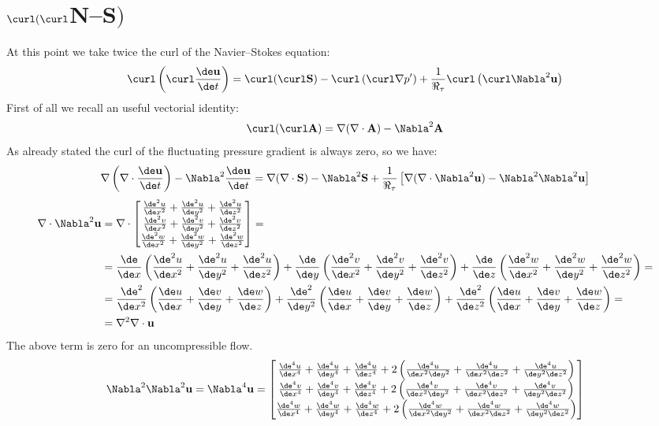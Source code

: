 \section{$\curl(\curl$N--S$)$}
At this point we take twice the curl of the Navier--Stokes equation:
\[
\curl\left(\curl\frac{\de \mathbf u}{\de t}\right)=\curl(\curl\mathbf S)-\curl\left(\curl\nabla p'\right)+\frac{1}{\Re_\tau}\curl\left(\curl\Nabla^2 \mathbf u\right)
\]
First of all we recall an useful vectorial identity:
\[
\curl(\curl \mathbf A)=\nabla(\nabla\cdot\mathbf A)-\Nabla^2\mathbf A
\]
As already stated the curl of the fluctuating pressure gradient is always zero, so we have:
\[
\nabla\left(\nabla\cdot\frac{\de \mathbf u}{\de t}\right)-\Nabla^2\frac{\de \mathbf u}{\de t}=\nabla(\nabla\cdot\mathbf S)-\Nabla^2\mathbf S+\frac{1}{\Re_\tau}\left[\nabla(\nabla\cdot\Nabla^2 \mathbf u)-\Nabla^2\Nabla^2 \mathbf u\right]
\]
\renewcommand\arraystretch{1.5}
\[
\begin{split}
\nabla\cdot\Nabla^2 \mathbf u&=\nabla \cdot
\begin{bmatrix}
\frac{\de^2 u}{\de x^2}+\frac{\de^2 u}{\de y^2}+\frac{\de^2 u}{\de z^2}\\
\frac{\de^2 v}{\de x^2}+\frac{\de^2 v}{\de y^2}+\frac{\de^2 v}{\de z^2}\\
\frac{\de^2 w}{\de x^2}+\frac{\de^2 w}{\de y^2}+\frac{\de^2 w}{\de z^2}\\
\end{bmatrix} =\\
&=\frac{\de}{\de x}\left( \frac{\de^2 u}{\de x^2}+\frac{\de^2 u}{\de y^2}+\frac{\de^2 u}{\de z^2} \right) +
\frac{\de}{\de y} \left( \frac{\de^2 v}{\de x^2}+\frac{\de^2 v}{\de y^2}+\frac{\de^2 v}{\de z^2} \right)+
\frac{\de}{\de z} \left( \frac{\de^2 w}{\de x^2}+\frac{\de^2 w}{\de y^2}+\frac{\de^2 w}{\de z^2} \right)=\\
&=\frac{\de^2}{\de x^2}\left( \frac{\de u}{\de x}+\frac{\de v}{\de y}+\frac{\de w}{\de z} \right)+
\frac{\de^2}{\de y^2}\left( \frac{\de u}{\de x}+\frac{\de v}{\de y}+\frac{\de w}{\de z} \right)+
\frac{\de^2}{\de z^2}\left( \frac{\de u}{\de x}+\frac{\de v}{\de y}+\frac{\de w}{\de z} \right)=\\
&=\nabla^2 \nabla\cdot\mathbf u
\end{split}
\]
\renewcommand\arraystretch{1}
The above term is zero for an uncompressible flow.\\
\renewcommand\arraystretch{1.5}
\[
\Nabla^2\Nabla^2\mathbf u=\Nabla^4 \mathbf u=
\begin{bmatrix}
\frac{\de^4 u}{\de x^4}+\frac{\de^4 u}{\de y^4}+\frac{\de^4 u}{\de z^4}+2\left( \frac{\de^4 u}{\de x^2\de y^2} + \frac{\de^4 u}{\de x^2\de z^2} +\frac{\de^4 u}{\de y^2\de z^2}\right)\\
\frac{\de^4 v}{\de x^4}+\frac{\de^4 v}{\de y^4}+\frac{\de^4 v}{\de z^4}+2\left( \frac{\de^4 v}{\de x^2\de y^2} + \frac{\de^4 v}{\de x^2\de z^2} +\frac{\de^4 v}{\de y^2\de z^2}\right)\\
\frac{\de^4 w}{\de x^4}+\frac{\de^4 w}{\de y^4}+\frac{\de^4 w}{\de z^4}+2\left( \frac{\de^4 w}{\de x^2\de y^2} + \frac{\de^4 w}{\de x^2\de z^2} +\frac{\de^4 w}{\de y^2\de z^2}\right)\\
\end{bmatrix}
\]
